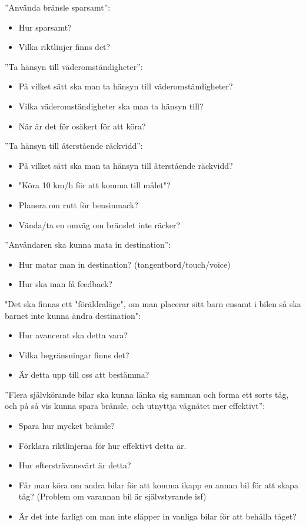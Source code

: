 \documentclass[10pt]{article}
\begin{document}
\noindent ”Använda bränsle sparsamt”:
\begin{itemize}
\item Hur sparsamt? 
\item Vilka riktlinjer finns det?
\end{itemize}
\hfill \break

\noindent ”Ta hänsyn till väderomständigheter”:
\begin{itemize}
\item På vilket sätt ska man ta hänsyn till väderomständigheter?
\item Vilka väderomständigheter ska man ta hänsyn till?
\item När är det för osäkert för att köra?
\end{itemize}
\hfill \break

\noindent ”Ta hänsyn till återstående räckvidd”:
\begin{itemize}
\item På vilket sätt ska man ta hänsyn till återstående räckvidd?
\item "Köra 10 km/h för att komma till målet"?
\item Planera om rutt för bensinmack?
\item Vända/ta en omväg om bränslet inte räcker?
\end{itemize}
\hfill \break

\noindent ”Användaren ska kunna mata in destination”:
\begin{itemize}
\item Hur matar man in destination? (tangentbord/touch/voice)
\item Hur ska man få feedback?
\end{itemize}
\hfill \break

\noindent"Det ska finnas ett "föräldraläge", om man placerar sitt barn ensamt i bilen så ska barnet inte kunna ändra destination":
\begin{itemize}
\item Hur avancerat ska detta vara?
\item Vilka begränsningar finns det?
\item Är detta upp till oss att bestämma?
\end{itemize}
\hfill \break

\noindent ”Flera självkörande bilar ska kunna länka sig samman och forma ett sorts tåg, och på så vis kunna spara bränsle, och utnyttja vägnätet mer effektivt”:
\begin{itemize}
\item Spara hur mycket bränsle?
\item Förklara riktlinjerna för hur effektivt detta är.
\item Hur eftersträvansvärt är detta?
\item Får man köra om andra bilar för att komma ikapp en annan bil för att skapa tåg? (Problem om varannan bil är självstyrande isf)
\item Är det inte farligt om man inte släpper in vanliga bilar för att behålla tåget? 
\end{itemize}
\hfill \break
\end{document}
